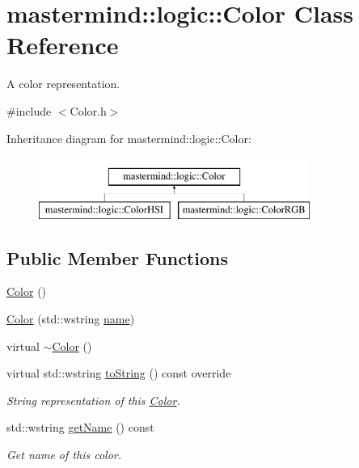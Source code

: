\hypertarget{classmastermind_1_1logic_1_1_color}{}\section{mastermind\+:\+:logic\+:\+:Color Class Reference}
\label{classmastermind_1_1logic_1_1_color}


A color representation.  




{\ttfamily \#include $<$Color.\+h$>$}

Inheritance diagram for mastermind\+:\+:logic\+:\+:Color\+:\begin{figure}[H]
\begin{center}
\leavevmode
\includegraphics[height=2.000000cm]{classmastermind_1_1logic_1_1_color}
\end{center}
\end{figure}
\subsection*{Public Member Functions}
\begin{DoxyCompactItemize}
\item 
\hyperlink{classmastermind_1_1logic_1_1_color_a9f3666f78ecc894138a724d57ec271b2}{Color} ()
\item 
\hyperlink{classmastermind_1_1logic_1_1_color_ac1e72fd3f7927c56259c3bcce1b2b248}{Color} (std\+::wstring \hyperlink{classmastermind_1_1logic_1_1_color_aa086b665d9a43db3acbd43ed7f4d31ba}{name})
\item 
virtual \hyperlink{classmastermind_1_1logic_1_1_color_ab8ea1579c6a52d47a0dfeb7eb524e147}{$\sim$\+Color} ()
\item 
virtual std\+::wstring \hyperlink{classmastermind_1_1logic_1_1_color_ab911e1ca9d820b7d97c8e014ff75bc49}{to\+String} () const override
\begin{DoxyCompactList}\small\item\em String representation of this \hyperlink{classmastermind_1_1logic_1_1_color}{Color}. \end{DoxyCompactList}\item 
std\+::wstring \hyperlink{classmastermind_1_1logic_1_1_color_a4a591bc7e973ba8a224d63d32929daf1}{get\+Name} () const
\begin{DoxyCompactList}\small\item\em Get name of this color. \end{DoxyCompactList}\end{DoxyCompactItemize}
